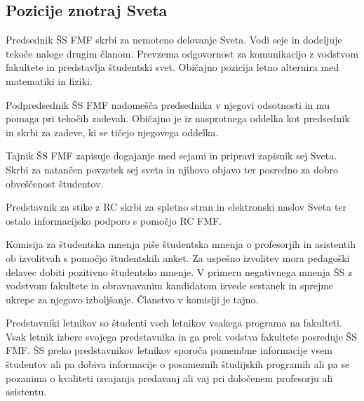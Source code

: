 \documentclass[a4paper,oneside,12pt]{article}
\theoremstyle{definition}
\newenvironment{description*}{\vspace{-6pt}\begin{description}\setlength{\itemsep}{0pt}\setlength{\parskip}{2pt}}{\end{description}\vspace{-1\parskip}}
\begin{document}
\subsection*{Pozicije znotraj Sveta}
\begin{description*}
  \item[Predsednik ŠS FMF] skrbi za nemoteno delovanje Sveta. Vodi seje in dodeljuje tekoče naloge
    drugim članom. Prevzema odgovornost za komunikacijo z vodstvom fakultete in predstavlja
    študentski svet. Običajno pozicija letno alternira med matematiki in fiziki.
  \item[Podpredsednik ŠS FMF] nadomešča predsednika v njegovi odsotnosti in mu pomaga pri tekočih
    zadevah. Običajno je iz nasprotnega oddelka kot predsednik in skrbi za zadeve, ki se tičejo
    njegovega oddelka.
  \item[Tajnik ŠS FMF] zapisuje dogajanje med sejami in pripravi zapisnik sej Sveta. Skrbi za
    natančen povzetek sej sveta in njihovo objavo ter posredno za dobro obveščenost študentov.
  \item[Predstavnik za stike z RC] skrbi za spletno stran in elektronski naslov Sveta ter ostalo
    informacijsko podporo s pomočjo RC FMF.
  \item[Komisija za študentska mnenja] piše študentska mnenja o profesorjih in asistentih ob
    izvolitvah s pomočjo študentskih anket. Za uspešno izvolitev mora pedagoški delavec dobiti
    pozitivno študentsko mnenje. V primeru negativnega mnenja ŠS z vodstvom fakultete in
    obravnavanim kandidatom izvede sestanek in sprejme ukrepe za njegovo izboljšanje. Članstvo v komisiji je tajno.
  \item[Predstavniki letnikov] so študenti vseh letnikov vsakega programa na fakulteti. Vsak letnik
    izbere svojega predstavnika in ga prek vodstva fakultete posreduje ŠS FMF. ŠS preko
    predstavnikov letnikov sporoča pomembne informacije vsem študentov ali pa dobiva informacije o
    posameznih študijskih programih ali pa se pozanima o kvaliteti izvajanja predavanj ali vaj pri
    določenem profesorju ali asistentu.
\end{description*}
\end{document}
